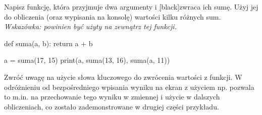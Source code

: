 % 
% 
% 
% 




\dbEntryCheckResults
Napisz funkcję, która przyjmuje dwa argumenty i \ul[black]{zwraca} ich sumę. Użyj jej do obliczenia (oraz wypisania na konsolę) wartości kilku różnych sum.
\\\textit{Wskazówka:  powinien być użyty na zewnątrz tej funkcji.}

\fi
{}\dbEntryCheckResults
\begin{CodeFrame*}[python]{}
def suma(a, b):
  return a + b

a = suma(17, 15)
print(a, suma(13, 16), suma(a, 11))
\end{CodeFrame*}
%
Zwróć uwagę na użycie słowa kluczowego  do zwrócenia wartości z funkcji.
W odróżnieniu od bezpośredniego wpisania wyniku na ekran z użyciem np.  pozwala to m.in. na przechowanie tego wyniku w zmiennej i użycie w dalszych obliczeniach,
co zostało zademonstrowane w drugiej części przykładu.
\fi


